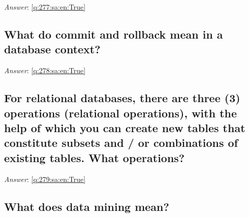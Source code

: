 \documentclass[a4paper,11pt,oneside]{article}
\begin{document}
\begin{sloppypar}
\label{q:277:sa:en:False}

\vspace{2cm}

\noindent\makebox[\textwidth]{\hrulefill}

\vspace{1cm}

\textit{Answer}: \autoref{q:277:sa:en:True}



\subsection{What do commit and rollback mean in a database context?}

\label{q:278:sa:en:False}

\vspace{2cm}

\noindent\makebox[\textwidth]{\hrulefill}

\vspace{1cm}

\textit{Answer}: \autoref{q:278:sa:en:True}



\subsection{For relational databases, there are three (3) operations (relational operations), with the help of which you can create new tables that constitute subsets and / or combinations of existing tables. What operations?}

\label{q:279:sa:en:False}

\vspace{2cm}

\noindent\makebox[\textwidth]{\hrulefill}

\vspace{1cm}

\textit{Answer}: \autoref{q:279:sa:en:True}



\subsection{What does data mining mean?}

\label{q:280:sa:en:False}

\vspace{2cm}

\noindent\makebox[\textwidth]{\hrulefill}

\vspace{1cm}


\end{sloppypar}
\end{document}
